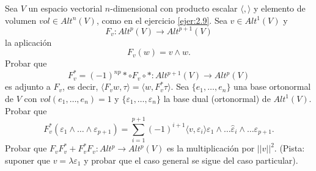\documentclass[twoside]{article}
\begin{document}
\begin{ejercicio}{2.11}
Sea $V$ un espacio vectorial $n$-dimensional con producto escalar $\langle,\rangle$ y elemento de volumen $vol\in Alt^n(V)$, como en el ejercicio \ref{ejer:2.9}. Sea $v\in Alt^1(V)$ y
\[
F_v:Alt^p(V)\to Alt^{p+1}(V)
\]
la aplicación
\[
F_v(w)=v\land w.
\]
Probar que 
\[
F^*_v=(-1)^{np}*\circ F_v\circ *: Alt^{p+1}(V)\to Alt^p(V)
\]
es adjunto a $F_v$, es decir, $\langle F_vw,\tau\rangle=\langle w,F^*_v\tau\rangle$. Sea $\{e_1,\dots, e_n\}$ una base ortonormal de $V$ con $vol(e_1,\dots,e_n)=1$ y $\{\varepsilon_1,\dots,\varepsilon_n\}$ la base dual (ortonormal) de $Alt^1(V)$. Probar que
\[
F^*_v(\varepsilon_1\land\dots\land\varepsilon_{p+1})=\sum_{i=1}^{p+1}(-1)^{i+1}\langle v,\varepsilon_i\rangle\varepsilon_1\land\dots\hat{\varepsilon}_i\land\dots\varepsilon_{p+1}.
\]
Probar que $F_vF^*_v+F^*_vF_v:Alt^p\to Alt^p(V)$ es la multiplicación por $||v||^2$. (Pista: suponer que $v=\lambda\varepsilon_1$ y probar que el caso general se sigue del caso particular).
\end{ejercicio}
\end{document}
